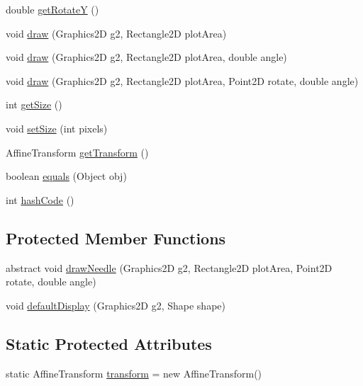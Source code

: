 \begin{DoxyCompactItemize}
\item 
double \mbox{\hyperlink{classorg_1_1jfree_1_1chart_1_1needle_1_1_meter_needle_addc715db36b291ef22ecd700e76b7df5}{get\+RotateY}} ()
\item 
void \mbox{\hyperlink{classorg_1_1jfree_1_1chart_1_1needle_1_1_meter_needle_aa5a2b5a0fd6206164795dc0448c5ec6a}{draw}} (Graphics2D g2, Rectangle2D plot\+Area)
\item 
void \mbox{\hyperlink{classorg_1_1jfree_1_1chart_1_1needle_1_1_meter_needle_a950f2918f81f496f7a542d910d5c69bf}{draw}} (Graphics2D g2, Rectangle2D plot\+Area, double angle)
\item 
void \mbox{\hyperlink{classorg_1_1jfree_1_1chart_1_1needle_1_1_meter_needle_a36084ddf5455d21e5c01f1adf97e42f5}{draw}} (Graphics2D g2, Rectangle2D plot\+Area, Point2D rotate, double angle)
\item 
int \mbox{\hyperlink{classorg_1_1jfree_1_1chart_1_1needle_1_1_meter_needle_aec6d8ab0cd2da5187d452d5bbbf8f0a2}{get\+Size}} ()
\item 
void \mbox{\hyperlink{classorg_1_1jfree_1_1chart_1_1needle_1_1_meter_needle_a19d2f9c732eacde16722b07c1af032b2}{set\+Size}} (int pixels)
\item 
Affine\+Transform \mbox{\hyperlink{classorg_1_1jfree_1_1chart_1_1needle_1_1_meter_needle_a5b5913c508281f575beee42c50dea9a3}{get\+Transform}} ()
\item 
boolean \mbox{\hyperlink{classorg_1_1jfree_1_1chart_1_1needle_1_1_meter_needle_a832ed9b41162b09cac330ed7dba5fca9}{equals}} (Object obj)
\item 
int \mbox{\hyperlink{classorg_1_1jfree_1_1chart_1_1needle_1_1_meter_needle_a8ac626f06090783fe78cd0ef54e32154}{hash\+Code}} ()
\end{DoxyCompactItemize}
\subsection*{Protected Member Functions}
\begin{DoxyCompactItemize}
\item 
abstract void \mbox{\hyperlink{classorg_1_1jfree_1_1chart_1_1needle_1_1_meter_needle_a8017d619faf14aedcc4cf95e68d5d74c}{draw\+Needle}} (Graphics2D g2, Rectangle2D plot\+Area, Point2D rotate, double angle)
\item 
void \mbox{\hyperlink{classorg_1_1jfree_1_1chart_1_1needle_1_1_meter_needle_afd91f3b2cd9a31f21fd68bca184887e9}{default\+Display}} (Graphics2D g2, Shape shape)
\end{DoxyCompactItemize}
\subsection*{Static Protected Attributes}
\begin{DoxyCompactItemize}
\item 
static Affine\+Transform \mbox{\hyperlink{classorg_1_1jfree_1_1chart_1_1needle_1_1_meter_needle_a387dc66ab2a7ae8e9d76146b69794c68}{transform}} = new Affine\+Transform()
\end{DoxyCompactItemize}


